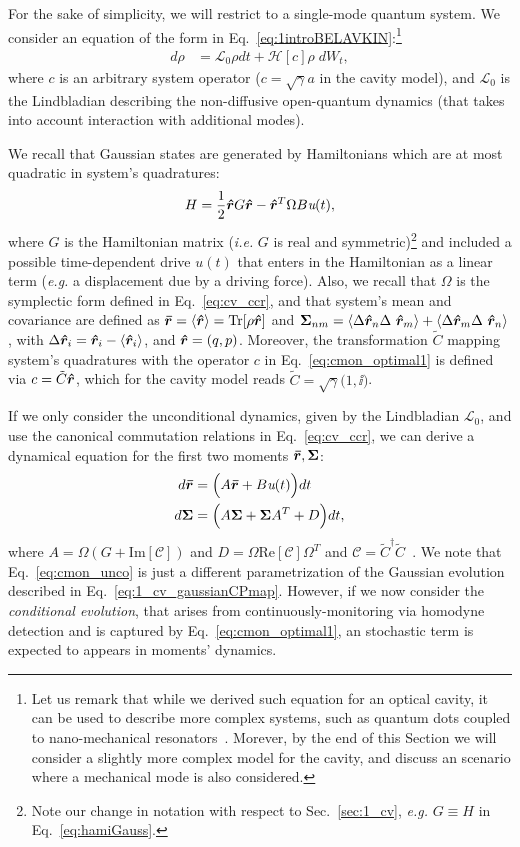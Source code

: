For the sake of simplicity, we will restrict to a single-mode quantum system. We consider an equation of the form in Eq.~\ref{eq:1introBELAVKIN}:\footnote{Let us remark that while we derived such equation for an optical cavity, it can be used to describe more complex systems, such as quantum dots coupled to nano-mechanical resonators~\cite{wisemanbook}. Morever, by the end of this Section we will consider a slightly more complex model for the cavity, and discuss an scenario where a mechanical mode is also considered.}
\begin{align}\label{eq:cmon_optimal1}
d\rho &= \mathcal{L}_0 \rho dt + \mathcal{H}[c]\rho \; dW_t,
\end{align}
where $c$ is an arbitrary system operator ($c=\sqrt{\gamma}a$ in the cavity model), and $\mathcal{L}_0$ is the Lindbladian describing the non-diffusive open-quantum dynamics (that takes into account interaction with additional modes).

We recall that Gaussian states are generated by Hamiltonians which are at most quadratic in system's quadratures:
\begin{align}
H = \frac{1}{2} \bm{\hat{r}} G \bm{\hat{r}} - \bm{\hat{r}}^T \Omega B \textit{u}(t),
\end{align}
where $G$ is the Hamiltonian matrix (\textit{i.e.} $G$ is real and symmetric)\footnote{Note our change in notation with respect to Sec.~\ref{sec:1_cv}, \textit{e.g.} $G\equiv H$ in Eq.~\ref{eq:hamiGauss}.} and included a possible time-dependent drive $\textit{u}(t)$ that enters in the Hamiltonian as a linear term (\textit{e.g.} a displacement due by a driving force). Also, we recall that $\Omega$ is the symplectic form defined in Eq.~\ref{eq:cv_ccr}, and that system's mean and covariance are defined as $\bm{\bar{r}} = \mathinner{\langle \bm{\hat{r}}\rangle} = \text{Tr}[\rho \bm{\hat{r}}]$ and $\cov_{nm} = \expect{\Delta \rop_n \Delta \rop_m} + \expect{\Delta \rop_m \Delta \rop_n}$, with $\Delta \bm{\hat{r}}_i = \bm{\hat{r}}_i - \mathinner{\langle \bm{\hat{r}}_i\rangle}$, and $\bm{\hat{r}} = (q, p)$.
Moreover, the transformation $\tilde{C}$ mapping system's quadratures with the operator $c$ in Eq.~\eqref{eq:cmon_optimal1} is defined via $c = \tilde{C} \bm{\hat{r}}$, which for the cavity model reads $\tilde{C}=\sqrt{\gamma}\Big(1, \ii\Big)$.

If we only consider the unconditional dynamics, given by the Lindbladian $\mathcal{L}_0$, and use the canonical commutation relations in Eq.~\ref{eq:cv_ccr}, we can derive a dynamical equation for the first two moments $\bm{\bar{r}}, \bm{\Sigma}$:
\begin{align}\label{eq:cmon_unco}
d \bm{\bar{r}} &= \Big(A\bm{\bar{r}}  + B\textit{u}(t)\Big) dt\\
d \bm{\Sigma} &= \Big(A \bm{\Sigma} + \bm{\Sigma} A^T + D \Big) dt, \nonumber
\end{align}
where $A = \Omega( G + \text{Im}[\mathcal{C}])$ and $D = \Omega \text{Re}[\mathcal{C}]\Omega^T$ and $\mathcal{C} = \tilde{C}^\dagger \tilde{C}$~\cite{Wiseman2005optimal}. We note that Eq.~\ref{eq:cmon_unco} is just a different parametrization of the Gaussian evolution described in Eq.~\ref{eq:1_cv_gaussianCPmap}.
However, if we now consider the \textit{conditional evolution}, that arises from continuously-monitoring via homodyne detection and is captured by Eq.~\ref{eq:cmon_optimal1}, an stochastic term is expected to appears in moments' dynamics.

